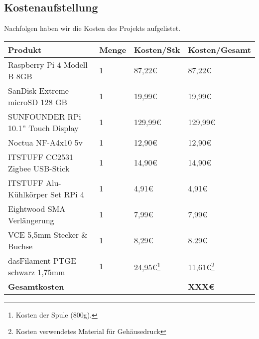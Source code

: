 \subsection{Kostenaufstellung}
Nachfolgen haben wir die Kosten des Projekts aufgelistet.\par
\begin{center}
\begin{tabularx}{\textwidth}{|p{5.6cm}|p{1.2cm}|p{3.5cm}|p{3.5cm}|}
 	\hline
 	\textbf{Produkt} & \textbf{Menge} & \textbf{Kosten/Stk}  & \textbf{Kosten/Gesamt}\\
	\hline
	Raspberry Pi 4 Modell B 8GB & 1 & 87,22\euro{} & 87,22\euro{} \\
	\hline
	SanDisk Extreme microSD 128 GB & 1 & 19,99\euro{} & 19,99\euro{} \\
	\hline
	SUNFOUNDER RPi 10.1'' Touch Display & 1 & 129,99\euro{} & 129,99\euro{} \\
	\hline
	Noctua NF-A4x10 5v & 1 & 12,90\euro{} & 12,90\euro{} \\
	\hline
	ITSTUFF CC2531 Zigbee USB-Stick & 1 & 14,90\euro{} & 14,90\euro{} \\
	\hline
	ITSTUFF Alu-Kühlkörper Set RPi 4 & 1 & 4,91\euro{} & 4,91\euro{} \\
	\hline
	Eightwood SMA Verlängerung & 1 & 7,99\euro{} & 7,99\euro{} \\ 
	\hline
	VCE 5,5mm Stecker \& Buchse & 1 & 8,29\euro{} & 8.29\euro{} \\
	\hline
	dasFilament PTGE schwarz 1,75mm & 1 & 24,95\euro{}\footnote{Kosten der Spule (800g).} & 11,61\euro{}\footnote{Kosten verwendetes Material für Gehäusedruck} \\
	\hline
	\textbf{Gesamtkosten} &  &  & \textbf{XXX\euro{}} \\ %
	\hline
\end{tabularx}
\end{center}

